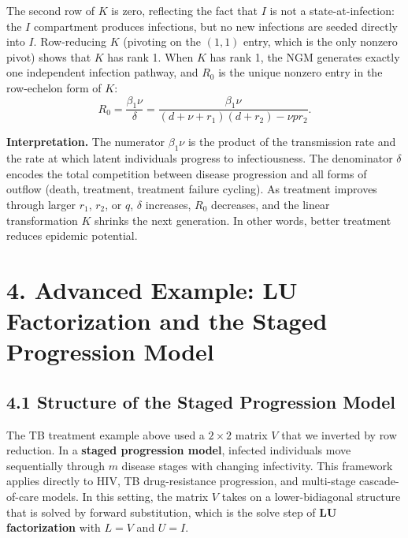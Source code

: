 \documentclass[12pt]{article}
\theoremstyle{plain}
\theoremstyle{definition}
\begin{document}
The second row of $K$ is zero, reflecting the fact that $I$ is not a state-at-infection:
the $I$ compartment produces infections, but no new infections are seeded directly into
$I$. Row-reducing $K$ (pivoting on the $(1,1)$ entry, which is the only nonzero pivot)
shows that $K$ has rank 1. When $K$ has rank 1, the NGM generates exactly one
independent infection pathway, and $R_0$ is the unique nonzero entry in the row-echelon
form of $K$:
\[
  \boxed{R_0 = \frac{\beta_1\nu}{\delta} = \frac{\beta_1\nu}{(d+\nu+r_1)(d+r_2) - \nu p r_2}.}
\]

\textbf{Interpretation.} The numerator $\beta_1\nu$ is the product of the transmission
rate and the rate at which latent individuals progress to infectiousness. The denominator
$\delta$ encodes the total competition between disease progression and all forms of outflow
(death, treatment, treatment failure cycling). As treatment improves through larger $r_1$,
$r_2$, or $q$, $\delta$ increases, $R_0$ decreases, and the linear transformation $K$
shrinks the next generation. In other words, better treatment reduces epidemic potential.

\section*{4. \quad Advanced Example: LU Factorization and the Staged Progression Model}

\subsection*{4.1 \quad Structure of the Staged Progression Model}

The TB treatment example above used a $2 \times 2$ matrix $V$ that we inverted by row
reduction. In a \textbf{staged progression model}, infected individuals move sequentially
through $m$ disease stages with changing infectivity. This framework applies directly to
HIV, TB drug-resistance progression, and multi-stage cascade-of-care models. In this
setting, the matrix $V$ takes on a lower-bidiagonal structure that is solved by forward
substitution, which is the solve step of \textbf{LU factorization} with $L = V$ and $U = I$.
\end{document}

